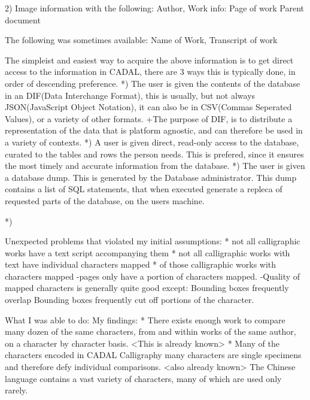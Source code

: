         2)  Image information with the following:
            Author,
            Work info:
                Page of work
                Parent document
            
            The following was sometimes available:
                Name of Work,
                Transcript of work
                
            The simpleist and easiest way to acquire the above information is to get direct access to the information in CADAL, there are 3 ways this is typically done, in order of descending preference.
            *)  The user is given the contents of the database in an DIF(Data Interchange Format), this is usually, but not always JSON(JavaScript Object Notation), it can also be in CSV(Commas Seperated Values), or a variety of other formats.
                +The purpose of DIF, is to distribute a representation of the data that is platform agnostic, and can  therefore be used in a variety of contexts.
            *)  A user is given direct, read-only access to the database, curated to the tables and rows the person needs.  This is prefered, since it ensures the most timely and accurate information from the database.
            *)  The user is given a database dump.  This is generated by the Database administrator.  This dump contains a list of SQL statements, that when executed generate a repleca of requested parts of the database, on the users machine.

            *)  
                














    Unexpected problems that violated my initial assumptions:
        * not all calligraphic works have a text script accompanying them
        * not all calligraphic works with text have individual characters mapped
        * of those calligraphic works with characters mapped
            -pages only have a portion of characters mapped.
            -Quality of mapped characters is generally quite good except:
                Bounding boxes frequently overlap
                Bounding boxes frequently cut off portions of the character.

What I was able to do:
    My findings:
        * There exists enough work to compare many dozen of the same characters, from and within works of the same author, on a character by character basis. <This is already known>
        *  Many of the characters encoded in CADAL Calligraphy many characters are single specimens and therefore defy individual comparisons.  <also already known>  The Chinese language contains a vast variety of characters, many of which are used only rarely.
    
